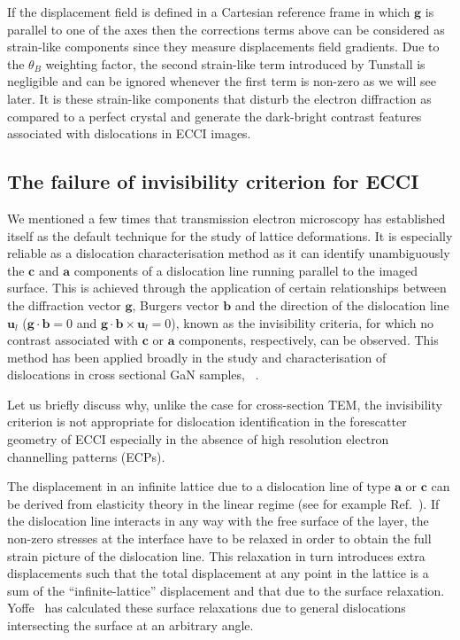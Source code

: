  If the displacement field is defined in a Cartesian reference frame in which $\mathbf{g}$ is parallel to one of the axes then the corrections terms above can be considered as strain-like components since they measure displacements field gradients. Due to the $\theta_B$ weighting factor, the second strain-like term introduced by Tunstall is negligible and can be ignored whenever the first term is non-zero as we will see later. It is these strain-like components that disturb the electron diffraction as compared to a perfect crystal and generate the dark-bright contrast features associated with dislocations in ECCI images.
 
\subsection{The failure of invisibility criterion for ECCI}

We mentioned a few times that transmission electron microscopy has established itself as the default technique for the study of lattice deformations. It is especially reliable as a dislocation characterisation method as it can identify unambiguously the $\mathbf{c}$ and $\mathbf{a}$ components of a dislocation line running parallel to the imaged surface. This is achieved through the application of certain relationships between the diffraction vector $\mathbf{g}$, Burgers vector $\mathbf{b}$ and the direction of the dislocation line $\mathbf{u}_l$ ($\mathbf{g} \cdot \mathbf{b} = 0$ and $\mathbf{g} \cdot \mathbf{b} \times \mathbf{u}_l = 0$), known as the invisibility criteria, for which no contrast associated with $\mathbf{c}$ or $\mathbf{a}$ components, respectively, can be observed. This method has been applied broadly in the study and characterisation of dislocations in cross sectional GaN samples, \eg ~\cite{Hino00}.


Let us briefly discuss why, unlike the case for cross-section TEM, the invisibility criterion is not appropriate for dislocation identification in the forescatter geometry of ECCI especially in the absence of high resolution electron channelling patterns (ECPs).

The displacement in an infinite lattice due to a dislocation line of type $\mathbf{a}$ or $\mathbf{c}$ can be derived from elasticity theory in the linear regime (see for example Ref.~\cite{Read53}). If the dislocation line interacts in any way with the free surface of the layer, the non-zero stresses at the interface have to be relaxed in order to obtain the full strain picture of the dislocation line. This relaxation in turn introduces extra displacements such that the total displacement at any point in the lattice is a sum of the ``infinite-lattice'' displacement and that due to the surface relaxation. Yoffe~\cite{Yoffe} has calculated these surface relaxations due to general dislocations intersecting the surface at an arbitrary angle.

